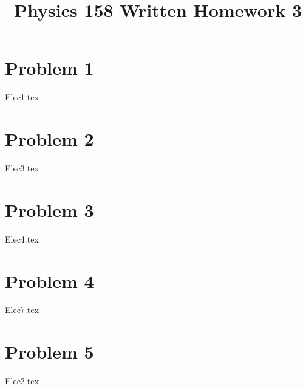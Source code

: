 \documentclass[11pt, fleqn]{article}
\title{Physics 158 Written Homework 3}
\author{}
\date{}
\begin{document}
\allowdisplaybreaks

\maketitle

\section*{Problem 1}
{Elec1.tex}
\section*{Problem 2}
{Elec3.tex}
\section*{Problem 3}
{Elec4.tex}
\section*{Problem 4}
{Elec7.tex}
\section*{Problem 5}
{Elec2.tex}
\end{document}
